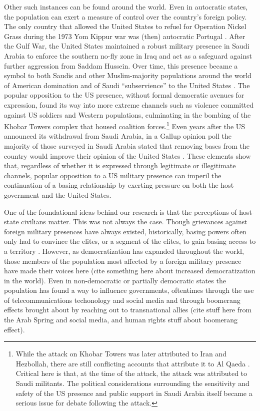{	Other such instances can be found around the world. Even in autocratic states, the population can exert a measure of control over the country's foreign policy. The only country that allowed the United States to refuel for Operation Nickel Grass during the 1973 Yom Kippur war was (then) autocratic Portugal \cite{sandars2000}.  After the Gulf War, the United States maintained a robust military presence in Saudi Arabia to enforce the southern no-fly zone in Iraq and act as a safeguard against further aggression from Saddam Hussein. Over time, this presence became a symbol to both Saudis and other Muslim-majority populations around the world of American domination and of Saudi ``subservience'' to the United States \cite{BBC2003}. The popular opposition to the US presence, without formal democratic avenues for expression, found its way into more extreme channels such as violence committed against US soldiers and Western populations, culminating in the bombing of the Khobar Towers complex that housed coalition forces.\footnote{While the attack on Khobar Towers was later attributed to Iran and Hezbollah, there are still conflicting accounts that attribute it to Al Qaeda \cite{NYT1996a, NYT1996b}. Critical here is that, at the time of the attack, the attack was attributed to Saudi militants. The political considerations surrounding the sensitivity and safety of the US presence and public support in Saudi Arabia itself became a serious issue for debate following the attack.} Even years after the US announced its withdrawal from Saudi Arabia, in a Gallup opinion poll the majority of those surveyed in Saudi Arabia stated that removing bases from the country would improve their opinion of the United States \cite{GallupSA2009}. These elements show that, regardless of whether it is expressed through legitimate or illegitimate channels, popular opposition to a US military presence can imperil the continuation of a basing relationship by exerting pressure on both the host government and the United States.

	

	One of the foundational ideas behind our research is that the perceptions of host-state civilians matter. This was not always the case. Though grievances against foreign military presences have always existed, historically, basing powers often only had to convince the elites, or a segment of the elites, to gain basing access to a territory \cite{Gillem2007}. However, as democratization has expanded throughout the world, those members of the population most affected by a foreign military presence have made their voices here (cite something here about increased democratization in the world). Even in non-democratic or partially democratic states the population has found a way to influence governments, oftentimes through the use of telecommunications techonology and social media and through boomerang effects brought about by reaching out to transnational allies (cite stuff here from the Arab Spring and social media, and human rights stuff about boomerang effect).  

}

